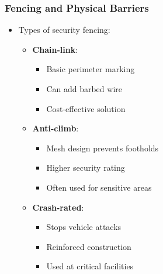 \documentclass{beamer}
\begin{document}
\begin{frame}
    \frametitle{Fencing and Physical Barriers}
    \begin{itemize}
        \item Types of security fencing:
            \begin{itemize}
                \item \textbf{Chain-link}:
                    \begin{itemize}
                        \item Basic perimeter marking
                        \item Can add barbed wire
                        \item Cost-effective solution
                    \end{itemize}
                \item \textbf{Anti-climb}:
                    \begin{itemize}
                        \item Mesh design prevents footholds
                        \item Higher security rating
                        \item Often used for sensitive areas
                    \end{itemize}
                \item \textbf{Crash-rated}:
                    \begin{itemize}
                        \item Stops vehicle attacks
                        \item Reinforced construction
                        \item Used at critical facilities
                    \end{itemize}
            \end{itemize}
    \end{itemize}
\end{frame}
\end{document}
